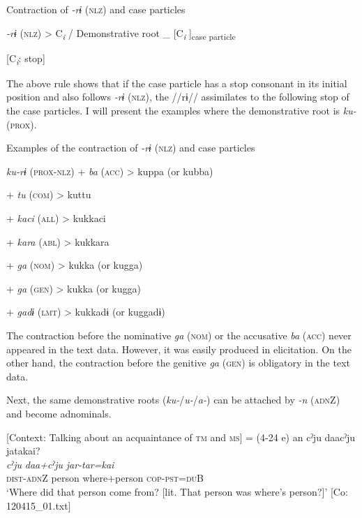 \ea \label{ex:5:20}   Contraction of \textit{{}-rɨ} (\textsc{nlz}) and case particles

  \textit{{}-rɨ} (\textsc{nlz})  >  C\textit{\textsubscript{i}}  /  Demonstrative root  \_  [C\textit{\textsubscript{i}}      ]\textsubscript{case particle}

                [C\textit{\textsubscript{i}}: stop]
\z

The above rule shows that if the case particle has a stop consonant in its initial position and also follows \textit{{}-rɨ} (\textsc{nlz}), the //rɨ// assimilates to the following stop of the case particles. I will present the examples where the demonstrative root is \textit{ku-} (\textsc{prox}).

\ea \label{ex:5:21}   Examples of the contraction of \textit{{}-rɨ} (\textsc{nlz}) and case particles

  \textit{ku-rɨ}  (\textsc{prox}-\textsc{nlz})  +  \textit{ba}  (\textsc{acc})  >  kuppa  (or kubba)

      +  \textit{tu}  (\textsc{com})  >  kuttu

      +  \textit{kaci}  (\textsc{all})  >  kukkaci

      +  \textit{kara}  (\textsc{abl})  >  kukkara

      +  \textit{ga}  (\textsc{nom})  >  kukka  (or kugga)

      +  \textit{ga}  (\textsc{gen})  >  kukka  (or kugga)

      +  \textit{gadɨ}  (\textsc{lmt})  >  kukkadɨ  (or kuggadɨ)
\z

The contraction before the nominative \textit{ga} (\textsc{nom}) or the accusative \textit{ba} (\textsc{acc}) never appeared in the text data. However, it was easily produced in elicitation. On the other hand, the contraction before the genitive \textit{ga} (\textsc{gen}) is obligatory in the text data.

Next, the same demonstrative roots (\textit{ku-}/\textit{u-}/\textit{a-}) can be attached by \textit{{}-n} (\textsc{adn}Z) and become adnominals.

\ea \label{ex:5:22}   [Context: Talking about an acquaintance of \textsc{tm} and \textsc{ms}] = (4-24 e)
\glll  an  cˀju  daacˀju  jatakai?\\
\textit{}  \textit{cˀju}  \textit{daa+cˀju}  \textit{jar-tar=kai}\\
\textsc{dist}-\textsc{adn}Z  person  where+person  \textsc{cop}-\textsc{pst}=\textsc{du}B\\
\glt ‘Where did that person come from? [lit. That person was where’s person?]’ [Co: 120415\_01.txt]
\z

